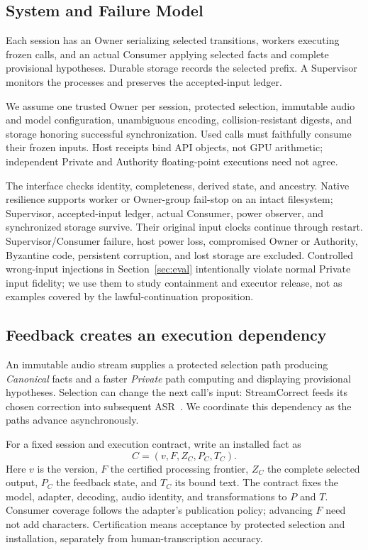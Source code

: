\subsection{System and Failure Model}\label{subsec:failure_model}
Each session has an Owner serializing selected transitions, workers
executing frozen calls, and an actual Consumer applying selected facts
and complete provisional hypotheses. Durable storage records the
selected prefix. A Supervisor monitors the processes and preserves the
accepted-input ledger.

We assume one trusted Owner per session, protected selection, immutable
audio and model configuration, unambiguous encoding, collision-resistant
digests, and storage honoring successful synchronization. Used calls must
faithfully consume their frozen inputs. Host receipts bind API objects,
not GPU arithmetic; independent Private and Authority floating-point
executions need not agree.

The interface checks identity, completeness, derived state, and ancestry.
Native resilience supports worker or Owner-group fail-stop on an intact
filesystem; Supervisor, accepted-input ledger, actual Consumer, power
observer, and synchronized storage survive. Their original input clocks
continue through restart. Supervisor/Consumer failure, host power loss,
compromised Owner or Authority, Byzantine code, persistent corruption,
and lost storage are excluded. Controlled wrong-input injections in
Section~\ref{sec:eval} intentionally violate normal Private input fidelity;
we use them to study containment and executor release, not as examples
covered by the lawful-continuation proposition.

\subsection{Feedback creates an execution dependency}
An immutable audio stream supplies a protected selection path producing
\emph{Canonical} facts and a faster \emph{Private} path computing and
displaying provisional hypotheses. Selection can change the next call's
input: StreamCorrect feeds its chosen correction into subsequent
ASR~\cite{vu2026streamcorrect}. We coordinate this dependency as the paths
advance asynchronously.

For a fixed session and execution contract, write an installed fact as
\begin{equation}
 C=(v,F,Z_C,P_C,T_C).
 \label{eq:canonical}
\end{equation}
Here $v$ is the version, $F$ the certified processing frontier, $Z_C$ the
complete selected output, $P_C$ the feedback state, and $T_C$ its bound
text. The contract fixes the model, adapter, decoding, audio identity,
and transformations to $P$ and $T$. Consumer coverage follows the adapter's
publication policy; advancing $F$ need not add characters. Certification
means acceptance by protected selection and installation, separately
from human-transcription accuracy.

